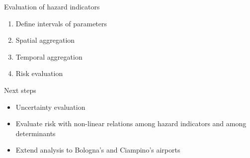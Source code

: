 \documentclass[aspectratio=43]{beamer}
\begin{document}
\begin{frame}{Evaluation of hazard indicators}
  \begin{enumerate}
    \item<1-> Define intervals of parameters
    \item<2-> Spatial aggregation
    \item<3-> Temporal aggregation
    \item<4-> Risk evaluation
  \end{enumerate}
\end{frame}


\begin{frame}{Next steps}
  \begin{itemize}
    \item Uncertainty evaluation
    \item Evaluate risk with non-linear relations among hazard indicators and among determinants
    \item Extend analysis to Bologna's and Ciampino's airports
  \end{itemize}
\end{frame}



\end{document}
